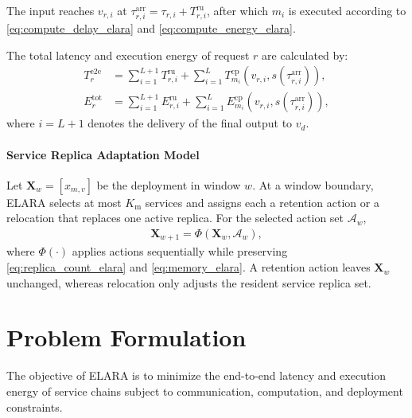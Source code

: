 \documentclass[10pt, conference, letterpaper]{IEEEtran}
\begin{document}
The input reaches $v_{r,i}$ at
$\tau_{r,i}^{\text{arr}}=\tau_{r,i}+T_{r,i}^{\text{ru}}$, after which $m_i$ is executed according to \eqref{eq:compute_delay_elara} and \eqref{eq:compute_energy_elara}.

The total latency and execution energy of request $r$ are calculated by:
\begin{align}
T_r^{\text{e2e}}
&=
{\sum}_{i=1}^{L+1}T_{r,i}^{\text{ru}}
+
{\sum}_{i=1}^{L}
T_{m_i}^{\text{cp}}
\left(v_{r,i},s\left(\tau_{r,i}^{\text{arr}}\right)\right),
\label{eq:req_e2e_lat}\\
E_r^{\text{tot}}
&=
{\sum}_{i=1}^{L+1}E_{r,i}^{\text{ru}}
+
{\sum}_{i=1}^{L}
E_{m_i}^{\text{cp}}
\left(v_{r,i},s\left(\tau_{r,i}^{\text{arr}}\right)\right),
\label{eq:req_tot_eng}
\end{align}
where $i=L+1$ denotes the delivery of the final output to $v_d$.


\paragraph{Service Replica Adaptation Model}
Let $\mathbf X_w=[x_{m,v}]$ be the deployment in window $w$. At a window boundary, ELARA selects at most $K_{\mathrm{ m}}$ services and assigns each a retention action or a relocation that replaces one active replica. For the selected action set $\mathcal A_w$,
\begin{align}
\mathbf{X}_{w+1} = \Phi(\mathbf{X}_w, \mathcal{A}_w),
\label{eq:deployment_transition}
\end{align}
where $\Phi(\cdot)$ applies actions sequentially while preserving \eqref{eq:replica_count_elara} and \eqref{eq:memory_elara}. A retention action leaves $\mathbf X_w$ unchanged, whereas relocation only adjusts the resident service replica set.

\section{Problem Formulation}
\label{sec:prob_form}
The objective of ELARA is to minimize the end-to-end latency and execution energy of service chains subject to communication, computation, and deployment constraints.
\end{document}
